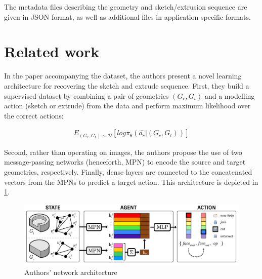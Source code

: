\documentclass[]{article}
\begin{document}
The metadata files describing the geometry and sketch/extrusion sequence are given in JSON format, as well as additional files in application specific formats.

\section{Related work}

In the paper accompanying the dataset, the authors present a novel learning architecture for recovering the sketch and extrude sequence. First, they build a supervised dataset by combining a pair of geometries $	(G_{c} , G_{t})$ and a modelling action (sketch or extrude) from the data and perform maximum likelihood over the correct actions:

\begin{align}
E_{(G_c, G_t) \sim \mathcal{D}}  \left[ log \pi_\theta \left( \hat{a_c} | \left(G_{c},G_{t}\right)  \right) \right]
\end{align}

Second, rather than operating on images, the authors propose the use of two message-passing networks (henceforth, MPN) to encode the source and target geometries, respectively. Finally, dense layers are connected to the concatenated vectors from the MPNs to predict a target action. This architecture is depicted in \ref{fig:arch}.


\begin{figure}
	\includegraphics[width=\textwidth]{architecture} 
	\caption{Authors' network architecture}
	\label{fig:arch}
\end{figure}
\end{document}
